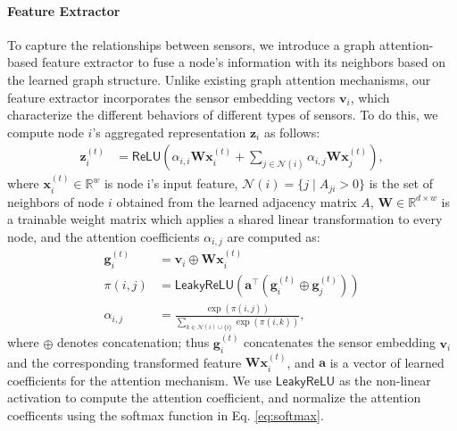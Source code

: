 \documentclass[letterpaper]{article} %
\begin{document}
\paragraph{Feature Extractor}
To capture the relationships between sensors, we introduce a graph attention-based feature extractor to fuse a node's information with its neighbors based on the learned graph structure. Unlike existing graph attention mechanisms, our feature extractor incorporates the sensor embedding vectors $\mathbf{v}_i$, which characterize the different behaviors of different types of sensors. To do this, we compute node $i$'s aggregated representation $\mathbf{z}_{i}$ as follows:
\begin{align}
    \mathbf{z}_{i}^{(t)} &= \mathsf{ReLU} \left( \alpha_{i, i} \mathbf{W} \mathbf{x}_{i}^{(t)}+\sum_{j \in \mathcal{N}(i)} \alpha_{i, j} \mathbf{W} \mathbf{x}_{j}^{(t)} \right),
\end{align}
where $\mathbf{x}_{i}^{(t)} \in \mathbb{R}^w $ is node i's input feature, $\mathcal{N}(i) =\{ {j \mid A_{ji} > 0} \}$ is the set of neighbors of node $i$ obtained from the learned adjacency matrix $A$, $\mathbf{W} \in \mathbb{R}^{d \times w}$ is a trainable weight matrix which applies a shared linear transformation to every node, and the attention coefficients $\alpha_{i,j}$ are computed as:
\begin{align}
    \mathbf{g}_{i}^{(t)} &= \mathbf{v}_{i} \oplus \mathbf{W} \mathbf{x}_{i}^{(t)} \label{eq:gi}\\
    \pi\left(i, j\right) &= \mathsf{LeakyReLU} \left(\mathbf{a}^{\top}\left( \mathbf{g}_{i}^{(t)}  \oplus \mathbf{g}_{j}^{(t)} \right)  \right) \\
    \alpha_{i, j} &= \frac{\exp \left(  \pi\left(i, j\right) \right) }{\sum_{k \in \mathcal{N}(i) \cup\{i\}} \exp \left(  \pi\left(i, k\right) \right)}, \label{eq:softmax}
\end{align}
where $\oplus$ denotes concatenation; thus $\mathbf{g}_{i}^{(t)}$ concatenates the sensor embedding $\mathbf{v}_{i}$ and the corresponding transformed feature $\mathbf{W} \mathbf{x}_{i}^{(t)}$, 
and $\mathbf{a}$ is a vector of learned coefficients for the attention mechanism. We use $\mathsf{LeakyReLU}$ as the non-linear activation to compute the attention coefficient, and normalize the attention coefficents using the softmax function in Eq. \eqref{eq:softmax}.
\end{document}

